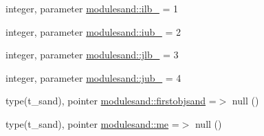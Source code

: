 \begin{DoxyCompactItemize}
integer, parameter \mbox{\hyperlink{namespacemodulesand_a361c6d30b64508e32b2c72304c92c23a}{modulesand\+::ilb\+\_\+}} = 1
\item 
integer, parameter \mbox{\hyperlink{namespacemodulesand_a0a47996e544a44541a8bdcab9d38a618}{modulesand\+::iub\+\_\+}} = 2
\item 
integer, parameter \mbox{\hyperlink{namespacemodulesand_aee51e6f004be2efd882579a87b57a18a}{modulesand\+::jlb\+\_\+}} = 3
\item 
integer, parameter \mbox{\hyperlink{namespacemodulesand_a64ac30037fd7a221834343e8d4affa61}{modulesand\+::jub\+\_\+}} = 4
\item 
type(t\+\_\+sand), pointer \mbox{\hyperlink{namespacemodulesand_a7851dcaac94d974f7dde72bc2e32cb6f}{modulesand\+::firstobjsand}} =$>$ null ()
\item 
type(t\+\_\+sand), pointer \mbox{\hyperlink{namespacemodulesand_a8a3859b7501b07ac6835ae78e6a9d150}{modulesand\+::me}} =$>$ null ()
\end{DoxyCompactItemize}
